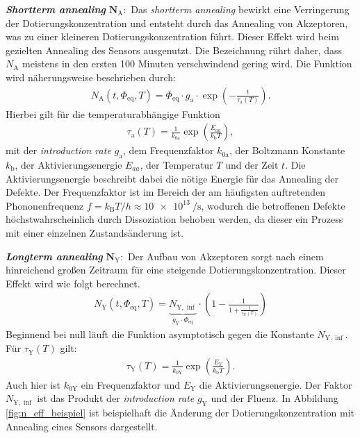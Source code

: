 \textbf{\textit{Shortterm annealing}} $\symbf{N_{\mathrm{A}}}:$ Das \textit{shortterm annealing} bewirkt eine Verringerung der Dotierungskonzentration und entsteht durch
das Annealing von Akzeptoren, was zu einer kleineren Dotierungskonzentration führt. Dieser Effekt wird beim
gezielten Annealing des Sensors ausgenutzt. Die Bezeichnung rührt daher, dass $N_{\mathrm{A}}$ meistens in den ersten 100 Minuten verschwindend gering wird. Die
Funktion wird näherungsweise beschrieben durch:
\begin{align}
  N_{\mathrm{A}}(t, \Phi_{\mathrm{eq}}, T) = \Phi_{\mathrm{eq}} \cdot g_{\mathrm{a}} \cdot \exp{\left(-\frac{t}{\tau_{\mathrm{a}}(T)}\right)}.
\end{align}
Hierbei gilt für die temperaturabhängige Funktion
\begin{align}
  \tau_{\mathrm{a}}(T) = \frac{1}{k_{0\mathrm{a}}}\exp{\left(\frac{E_{aa}}{k_{\mathrm{b}}T}\right)},
\end{align}
mit der \textit{introduction rate} $g_{\mathrm{a}}$, dem Frequenzfaktor $k_{0\mathrm{a}}$, der Boltzmann Konstante $k_{\mathrm{b}}$,
der Aktivierungsenergie $E_{aa}$, der Temperatur $T$ und der Zeit $t$. Die Aktivierungsenergie beschreibt dabei die nötige Energie für das Annealing der Defekte.
Der Frequenzfaktor ist im Bereich der am häufigsten auftretenden Phononenfrequenz ${f = k_{\mathrm{B}}T/h \approx \SI{10e13}{\per\second}}$, wodurch
die betroffenen Defekte höchstwahrscheinlich durch Dissoziation behoben werden, da dieser ein Prozess mit einer einzelnen Zustandsänderung ist.


\textbf{\textit{Longterm annealing}} $\symbf{N_{\mathrm{Y}}}:$ Der Aufbau von
Akzeptoren sorgt nach einem hinreichend großen Zeitraum für eine steigende
Dotierungskonzentration. Dieser Effekt wird wie folgt berechnet.
\begin{align}
  N_{\mathrm{Y}}(t, \Phi_{\mathrm{eq}}, T)     = \underbrace{N_{\mathrm{Y , \inf}}}_{g_{\mathrm{Y}}\cdot\Phi_{\mathrm{eq}}}\cdot \left(1 - \frac{1}{1 + \frac{t}{\tau_{\mathrm{Y}}(T)}}\right)
\end{align}
Beginnend bei null läuft die Funktion asymptotisch gegen die Konstante $N_{\mathrm{Y, \inf}}$.
Für $\tau_{\mathrm{Y}}(T)$ gilt:
\begin{align}
  \tau_{\mathrm{Y}}(T) = \frac{1}{k_{0\mathrm{Y}}}\exp{\left(\frac{E_{Y}}{k_{\mathrm{b}}T}\right)}.
\end{align}
Auch hier ist $k_{0\mathrm{Y}}$ ein Frequenzfaktor und $E_{\mathrm{Y}}$ die Aktivierungsenergie. Der Faktor $N_{\mathrm{Y , \inf}}$
ist das Produkt der \textit{introduction rate} $g_{\mathrm{Y}}$ und der Fluenz.
In Abbildung \ref{fig:n_eff_beispiel} ist beispielhaft die Änderung der Dotierungskonzentration mit Annealing eines
Sensors dargestellt.


